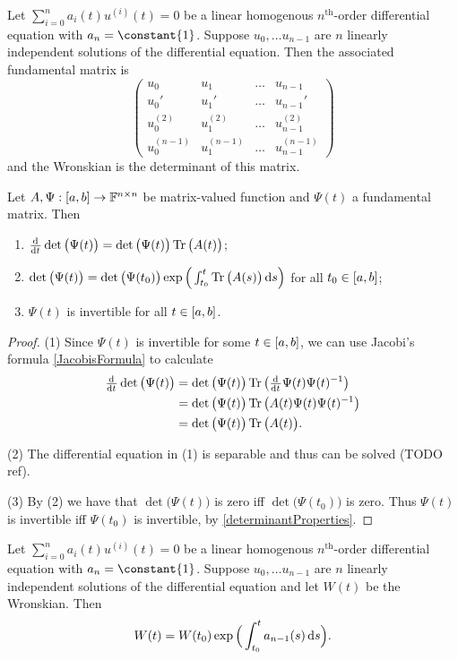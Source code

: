 Let $\sum_{i=0}^n a_i(t)u^{(i)}(t) = 0$ be a linear homogenous $n^\text{th}$-order differential equation with $a_n = \constant{1}$. Suppose $u_0, \ldots u_{n-1}$ are $n$ linearly independent solutions of the differential equation. Then the associated fundamental matrix is
\[ \begin{pmatrix}
u_0 & u_1 & \hdots & u_{n-1} \\
u_0' & u_1' & \hdots & u_{n-1}' \\
u_0^{(2)} & u_1^{(2)} & \hdots & u_{n-1}^{(2)} \\
u_0^{(n-1)} & u_1^{(n-1)} & \hdots & u_{n-1}^{(n-1)}
\end{pmatrix} \]
and the Wronskian is the determinant of this matrix.


\begin{proposition}
Let $A, \Psi: \interval{a,b}\to \F^{n\times n}$ be matrix-valued function and $\Psi(t)$ a fundamental matrix. Then
\begin{enumerate}
\item $\od{}{t}\det\big(\Psi(t)\big) = \det\big(\Psi(t)\big)\Tr\big(A(t)\big)$;
\item $\det\big(\Psi(t)\big) = \det\big(\Psi(t_0)\big) \exp\Big(\int_{t_0}^t\operatorname{Tr}\big(A(s)\big)\operatorname{d \!}{s}\Big)$ for all $t_0\in \interval{a,b}$;
\item $\Psi(t)$ is invertible for all $t\in \interval{a,b}$.
\end{enumerate}

\end{proposition}
\begin{proof}
(1) Since $\Psi(t)$ is invertible for some $t\in\interval{a,b}$, we can use Jacobi's formula \ref{JacobisFormula} to calculate
\begin{align*}
\od{}{t}\det\big(\Psi(t)\big) &= \det\big(\Psi(t)\big)\Tr\big(\od{}{t}\Psi(t)\Psi(t)^{-1}\big) \\
&= \det\big(\Psi(t)\big)\Tr\big(A(t)\Psi(t)\Psi(t)^{-1}\big) \\
&= \det\big(\Psi(t)\big)\Tr\big(A(t)\big).
\end{align*} 

(2) The differential equation in (1) is separable and thus can be solved (TODO ref).

(3) By (2) we have that $\det\big(\Psi(t)\big)$ is zero iff $\det\big(\Psi(t_0)\big)$ is zero. Thus $\Psi(t)$ is invertible iff $\Psi(t_0)$ is invertible,  by \ref{determinantProperties}.
\end{proof}
\begin{corollary}
Let $\sum_{i=0}^n a_i(t)u^{(i)}(t) = 0$ be a linear homogenous $n^\text{th}$-order differential equation with $a_n = \constant{1}$. Suppose $u_0, \ldots u_{n-1}$ are $n$ linearly independent solutions of the differential equation and let $W(t)$ be the Wronskian.
Then
\[ W(t) = W(t_0)\exp\Big(\int_{t_0}^t a_{n-1}(s) \operatorname{d \!}{s}\Big). \]
\end{corollary}
